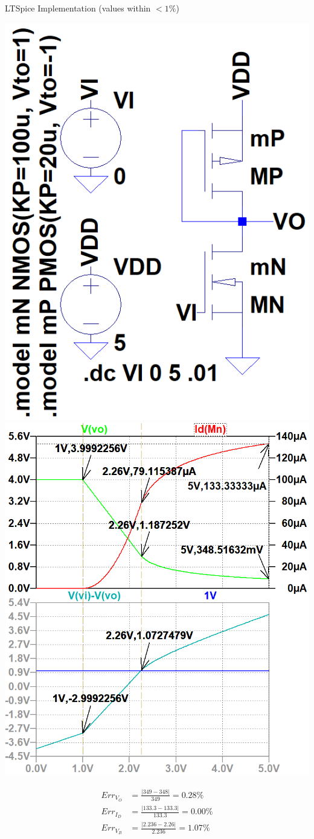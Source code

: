 \documentclass[12pt,letterpaper,titlepage]{article}
\begin{document}
\begin{raggedright}
\begin{center}
LTSpice Implementation (values within $<1\%$)
\begin{paracol}{2}
\includegraphics[width=.39\textwidth, height=\textheight, keepaspectratio=true]{ds1b}
\switchcolumn
\includegraphics[width=.58\textwidth, height=\textheight, keepaspectratio=true]{ds1c}
\end{paracol}
\begin{align*}
   Err_{V_O} &= \frac{|349 - 348|}{349} = 0.28\%
\\ Err_{I_D} &= \frac{|133.3 - 133.3|}{133.3} = 0.00\%
\\ Err_{V_{It}} &= \frac{|2.236 - 2.26|}{2.236} = 1.07\%
\end{align*}
\end{center}


\end{raggedright}
\end{document}
